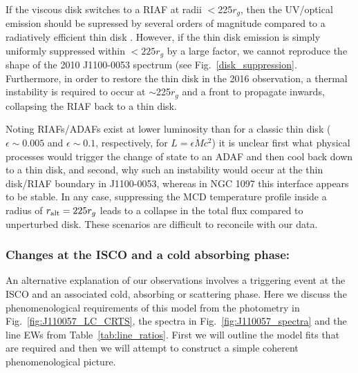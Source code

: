 \documentclass[a4paper,fleqn,usenatbib]{mnras}
\begin{document}
If the viscous disk switches to a RIAF at radii $<$225$r_{g}$, then
the UV/optical emission should be supressed by several orders of
magnitude compared to a radiatively efficient thin disk
\citep{Narayan1998, Abramowicz2002, Abramowicz2013}. However, if the
thin disk emission is simply uniformly suppressed within $<225r_{g}$
by a large factor, we cannot reproduce the shape of the 2010
J1100-0053 spectrum (see Fig.~\ref{disk_suppression}. Furthermore, in order to restore the thin disk in
the 2016 observation, a thermal instability is required to occur at
$\sim$225$r_{g}$ and a front to propagate inwards, collapsing the RIAF
back to a thin disk.

Noting RIAFs/ADAFs exist at lower luminosity than for a classic thin
disk ($\epsilon \sim 0.005$ and $\epsilon \sim 0.1$, respectively, for
$L=\epsilon \dot{M} c^{2}$) it is unclear first what physical
processes would trigger the change of state to an ADAF and then cool
back down to a thin disk, and second, why such an instability would
occur at the thin disk/RIAF boundary in J1100-0053, whereas in NGC
1097 this interface appears to be stable. In any case, suppressing the
MCD temperature profile inside a radius of $r_{{\rm alt}} = 225 r_{g}$
leads to a collapse in the total flux compared to unperturbed disk. 
These scenarios are difficult to reconcile with our data.


\subsubsection{Changes at the ISCO and a cold absorbing phase:}
An alternative explanation of our observations involves a triggering event at the ISCO and an associated cold, absorbing or scattering phase. Here we discuss the phenomenological requirements of this model from the photometry in Fig.~\ref{fig:J110057_LC_CRTS}, the spectra in Fig.~\ref{fig:J110057_spectra} and the line EWs from Table~\ref{tab:line_ratios}. First we will outline the model fits that are required and then we will attempt to construct a simple coherent phenomenological picture.
\end{document}
